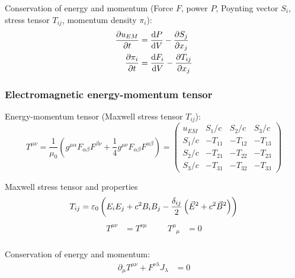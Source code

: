 			\noindent
			Conservation of energy and momentum (Force $F$, power $P$, Poynting vector $S_i$, stress tensor $T_{ij}$, momentum density $\pi_i$):
			\begin{equation}
				\begin{aligned}
					\frac{\partial u_{EM}}{\partial t} &= \frac{\mathrm{d} P}{\mathrm{d} V} - \frac{\partial S_j}{\partial x_j} \\
					\frac{\partial \pi_i}{\partial t} &=	\frac{\mathrm{d} F_i}{\mathrm{d} V} - \frac{\partial T_{ij}}{\partial x_j}
				\end{aligned}
			\end{equation}

		\subsubsection{Electromagnetic energy-momentum tensor}
			\noindent
			Energy-momentum tensor (Maxwell stress tensor $T_{ij}$):
			\begin{equation}
				T^{\mu\nu} = \frac{1}{\mu_0}\left(g^{\mu\alpha} F_{\alpha\beta} F^{\beta\nu} +\frac{1}{4}g^{\mu\nu} F_{\alpha\beta} F^{\alpha\beta} \right)
				= \left( \begin{matrix}
					u_{EM} & S_1/c & S_2/c & S_3/c \\
					S_1/c & -T_{11} & -T_{12} & -T_{13} \\
					S_2/c	& -T_{21} & -T_{22} & -T_{23} \\
					S_3/c & -T_{31} & -T_{32} & -T_{33}
				\end{matrix} \right)
			\end{equation}

			\noindent
			Maxwell stress tensor and properties
			\begin{equation}
				T_{ij} = \varepsilon_0 \left(  E_i E_j + c^2 B_i B_j - \frac{\delta_{ij}}{2}\left(  \vec{E}^2 + c^2 \vec{B}^2  \right)  \right)
			\end{equation}
			\begin{equation}
				\begin{aligned}
					T^{\mu\nu} &= T^{\nu\mu} &\hspace{20pt}
					T^\mu_{\phantom{\mu}\mu} &= 0 \\
				\end{aligned}
			\end{equation}

			\noindent
			Conservation of energy and momentum:
			\begin{equation}
				\begin{aligned}
					\partial_\mu T^{\mu\nu} + F^{\nu\lambda} J_\lambda &= 0
				\end{aligned}
			\end{equation}


